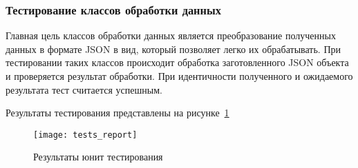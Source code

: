 \subsubsection{Тестирование классов обработки данных}

Главная цель классов обработки данных является преобразование полученных данных в формате JSON в вид, который позволяет легко их обрабатывать.
При тестировании таких классов происходит обработка заготовленного JSON объекта и проверяется результат обработки.
При идентичности полученного и ожидаемого результата тест считается успешным.

Результаты тестирования представлены на рисунке~\ref{pic:lit_testing:tests_report}

\begin{figure}
    \centering
    \texttt{[image: tests\_report]}
    \caption{Результаты юнит тестирования}
    \label{pic:lit_testing:tests_report}
\end{figure}
